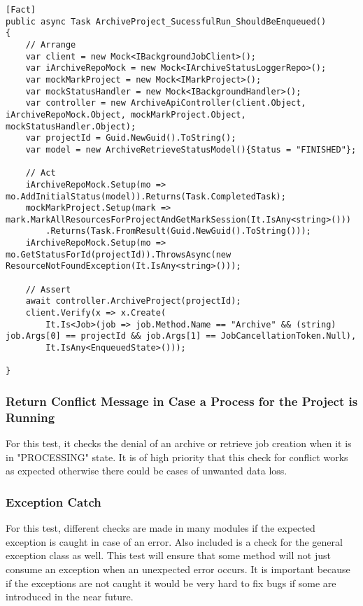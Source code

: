 \begin{lstlisting}[language={[Sharp]C}, caption={Hangfire Job creation test}, captionpos=b,label={lst:hangfireCreate}]
[Fact]
public async Task ArchiveProject_SucessfulRun_ShouldBeEnqueued()
{
    // Arrange
    var client = new Mock<IBackgroundJobClient>();
    var iArchiveRepoMock = new Mock<IArchiveStatusLoggerRepo>();
    var mockMarkProject = new Mock<IMarkProject>();
    var mockStatusHandler = new Mock<IBackgroundHandler>();
    var controller = new ArchiveApiController(client.Object, iArchiveRepoMock.Object, mockMarkProject.Object, mockStatusHandler.Object);
    var projectId = Guid.NewGuid().ToString();
    var model = new ArchiveRetrieveStatusModel(){Status = "FINISHED"}; 
    
    // Act
    iArchiveRepoMock.Setup(mo => mo.AddInitialStatus(model)).Returns(Task.CompletedTask);
    mockMarkProject.Setup(mark => mark.MarkAllResourcesForProjectAndGetMarkSession(It.IsAny<string>()))
        .Returns(Task.FromResult(Guid.NewGuid().ToString()));
    iArchiveRepoMock.Setup(mo => mo.GetStatusForId(projectId)).ThrowsAsync(new ResourceNotFoundException(It.IsAny<string>()));

    // Assert
    await controller.ArchiveProject(projectId);
    client.Verify(x => x.Create(
        It.Is<Job>(job => job.Method.Name == "Archive" && (string) job.Args[0] == projectId && job.Args[1] == JobCancellationToken.Null),
        It.IsAny<EnqueuedState>()));

}
\end{lstlisting}

\subsubsection{Return Conflict Message in Case a Process for the Project is Running}
For this test, it checks the denial of an archive or retrieve job creation when it is in "PROCESSING" state. It is of high priority that this check
for conflict works as expected otherwise there could be cases of unwanted data loss. 

\subsubsection{Exception Catch}
For this test, different checks are made in many modules if the expected exception is caught in case of an error. Also included is a check for the general
exception class as well. This test will ensure that some method will not just consume an exception when an unexpected error occurs. It is important because if 
the exceptions are not caught it would be very hard to fix bugs if some are introduced in the near future.

